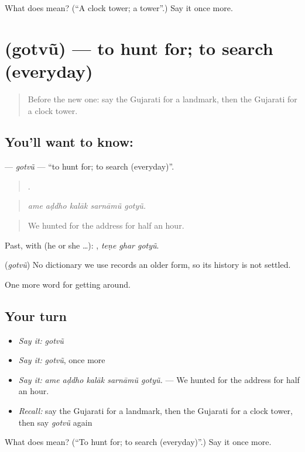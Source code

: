 \begin{tcolorbox}[breakable,colback=teal!4,colframe=teal!35!black,title={Before you move on}]
What does  mean? (\textquotedblleft{}A clock tower; a tower\textquotedblright{}.) Say it once more.
\end{tcolorbox}
\section[\texorpdfstring{\gu{ગોતવું} (gotvũ)}{ગોતવું (gotvũ)}]{ (gotvũ) — to hunt for; to search (everyday)}

\label{lesson:GU-C415-gotvu}



\begin{quote}
Before the new one: say the Gujarati for a landmark, then the Gujarati for a clock tower.
\end{quote}

\subsection*{You'll want to know: }
\textbf{} — \emph{gotvũ} — \textquotedblleft{}to hunt for; to search (everyday)\textquotedblright{}.

\begin{quote}
    .
\end{quote}

\begin{quote}
\emph{ame aḍdho kalāk sarnāmũ gotyũ.}
\end{quote}

\begin{quote}
We hunted for the address for half an hour.
\end{quote}

Past, with  (he or she …):   , \emph{teṇe ghar gotyũ}.

\begin{cousinweb}
\textbf{} (\emph{gotvũ}) No dictionary we use records an older form, so its history is not settled.
\end{cousinweb}

\begin{grammarlens}[title={What you've built}]
One more word for getting around.
\end{grammarlens}

\subsection*{Your turn}
\begin{itemize}
\raggedright
  \item \emph{Say it:} \emph{gotvũ}
  \item \emph{Say it:} \emph{gotvũ}, once more
  \item \emph{Say it:} \emph{ame aḍdho kalāk sarnāmũ gotyũ.} — We hunted for the address for half an hour.
  \item \emph{Recall:} say the Gujarati for a landmark, then the Gujarati for a clock tower, then say \emph{gotvũ} again
\end{itemize}

\begin{tcolorbox}[breakable,colback=teal!4,colframe=teal!35!black,title={Before you move on}]
What does  mean? (\textquotedblleft{}To hunt for; to search (everyday)\textquotedblright{}.) Say it once more.
\end{tcolorbox}
